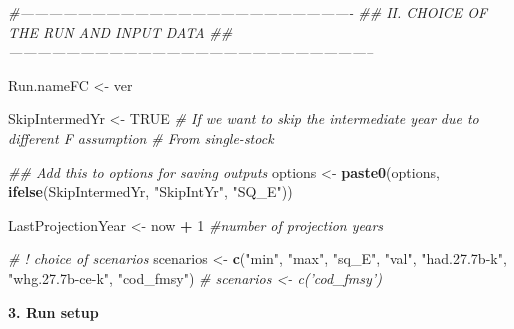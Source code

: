 \documentclass[
]{article}
\newenvironment{Shaded}{\begin{snugshade}}{\end{snugshade}}
\newcommand{\CommentTok}[1]{\textcolor[rgb]{0.56,0.35,0.01}{\textit{#1}}}
\newcommand{\DecValTok}[1]{\textcolor[rgb]{0.00,0.00,0.81}{#1}}
\newcommand{\KeywordTok}[1]{\textcolor[rgb]{0.13,0.29,0.53}{\textbf{#1}}}
\newcommand{\NormalTok}[1]{#1}
\newcommand{\OperatorTok}[1]{\textcolor[rgb]{0.81,0.36,0.00}{\textbf{#1}}}
\newcommand{\OtherTok}[1]{\textcolor[rgb]{0.56,0.35,0.01}{#1}}
\newcommand{\StringTok}[1]{\textcolor[rgb]{0.31,0.60,0.02}{#1}}
\begin{document}
\begin{Shaded}
\begin{Highlighting}[]
\CommentTok{#----------------------------------------------------------------------}
\CommentTok{## II. CHOICE OF THE RUN AND INPUT DATA}
\CommentTok{##-----------------------------------------------------------------------------}

\NormalTok{Run.nameFC <-}\StringTok{ }\NormalTok{ver}

\NormalTok{SkipIntermedYr <-}\StringTok{ }\OtherTok{TRUE}  \CommentTok{# If we want to skip the intermediate year due to different F assumption}
\CommentTok{# From single-stock}

\CommentTok{## Add this to options for saving outputs}
\NormalTok{options <-}\StringTok{ }\KeywordTok{paste0}\NormalTok{(options, }\KeywordTok{ifelse}\NormalTok{(SkipIntermedYr, }\StringTok{"SkipIntYr"}\NormalTok{, }\StringTok{"SQ_E"}\NormalTok{))}

\NormalTok{LastProjectionYear <-}\StringTok{ }\NormalTok{now }\OperatorTok{+}\StringTok{ }\DecValTok{1}  \CommentTok{#number of projection years}

\CommentTok{# ! choice of scenarios}
\NormalTok{scenarios <-}\StringTok{ }\KeywordTok{c}\NormalTok{(}\StringTok{"min"}\NormalTok{, }\StringTok{"max"}\NormalTok{, }\StringTok{"sq_E"}\NormalTok{, }\StringTok{"val"}\NormalTok{, }\StringTok{"had.27.7b-k"}\NormalTok{, }\StringTok{"whg.27.7b-ce-k"}\NormalTok{, }\StringTok{"cod_fmsy"}\NormalTok{)}
\CommentTok{# scenarios <- c('cod_fmsy')}
\end{Highlighting}
\end{Shaded}

\textbf{3. Run setup}
\end{document}
